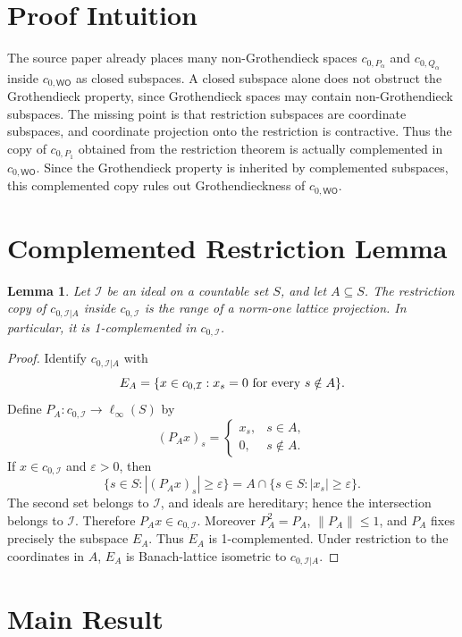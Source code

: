 \documentclass[11pt]{article}
\newtheorem{lemma}{Lemma}
\newcommand{\WO}{\mathsf{WO}}
\newcommand{\I}{\mathcal I}
\begin{document}
\section*{Proof Intuition}

The source paper already places many non-Grothendieck spaces
\(c_{0,P_\alpha}\) and \(c_{0,Q_\alpha}\) inside \(c_{0,\WO}\) as closed
subspaces.  A closed subspace alone does not obstruct the Grothendieck
property, since Grothendieck spaces may contain non-Grothendieck subspaces.
The missing point is that restriction subspaces are coordinate subspaces, and
coordinate projection onto the restriction is contractive.  Thus the copy of
\(c_{0,P_1}\) obtained from the restriction theorem is actually complemented
in \(c_{0,\WO}\).  Since the Grothendieck property is inherited by
complemented subspaces, this complemented copy rules out Grothendieckness of
\(c_{0,\WO}\).

\section*{Complemented Restriction Lemma}

\begin{lemma}
Let \(\I\) be an ideal on a countable set \(S\), and let \(A\subseteq S\).
The restriction copy of \(c_{0,\I|A}\) inside \(c_{0,\I}\) is the range of a
norm-one lattice projection.  In particular, it is 1-complemented in
\(c_{0,\I}\).
\end{lemma}

\begin{proof}
Identify \(c_{0,\I|A}\) with
\[
  E_A=\{x\in c_{0,\I}: x_s=0 \hbox{ for every } s\notin A\}.
\]
Define \(P_A:c_{0,\I}\to \ell_\infty(S)\) by
\[
  (P_Ax)_s =
  \begin{cases}
    x_s, & s\in A,\\
    0, & s\notin A.
  \end{cases}
\]
If \(x\in c_{0,\I}\) and \(\varepsilon>0\), then
\[
  \{s\in S: |(P_Ax)_s|\geq \varepsilon\}
  =
  A\cap \{s\in S: |x_s|\geq \varepsilon\}.
\]
The second set belongs to \(\I\), and ideals are hereditary; hence the
intersection belongs to \(\I\).  Therefore \(P_Ax\in c_{0,\I}\).
Moreover \(P_A^2=P_A\), \(\|P_A\|\leq 1\), and \(P_A\) fixes precisely the
subspace \(E_A\).  Thus \(E_A\) is 1-complemented.  Under restriction to the
coordinates in \(A\), \(E_A\) is Banach-lattice isometric to \(c_{0,\I|A}\).
\end{proof}

\section*{Main Result}
\end{document}
